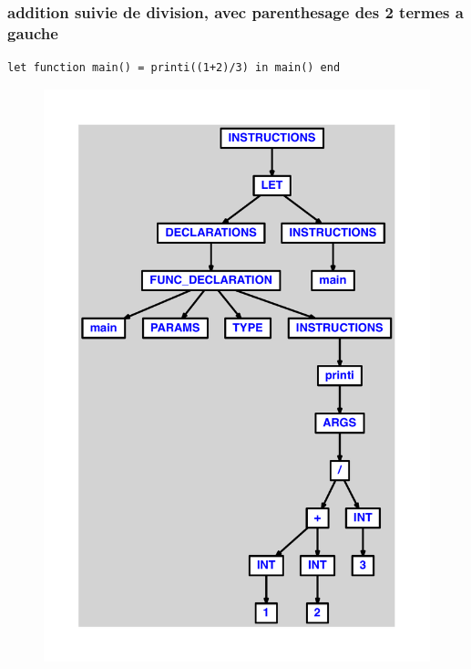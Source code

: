 \documentclass{article}
\begin{document}
\subsubsection{addition suivie de division, avec parenthesage des 2 termes a gauche}
\begin{lstlisting}
let function main() = printi((1+2)/3) in main() end
\end{lstlisting}
\newpage
\begin{figure}[H]
\centering
\includegraphics[max width=\textwidth]{ast/ast_98.pdf}
\end{figure}
\newpage
\end{document}
